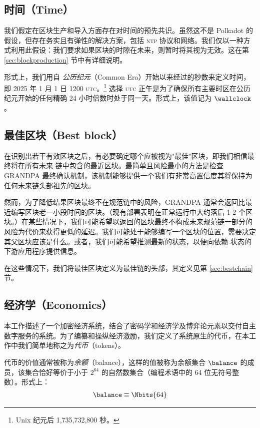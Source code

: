 \subsection{时间（Time）}\label{sec:commonera}

我们假定在区块生产和导入方面存在对时间的预先共识。虽然这不是 Polkadot 的假设，但存在务实且有弹性的解决方案，包括 \textsc{ntp} 协议和网络。我们仅以一种方式利用此假设：我们要求如果区块的时隙在未来，则暂时将其视为无效。这在第 \ref{sec:blockproduction} 节中有详细说明。

形式上，我们用自 \Jam\emph{公历纪元}（Common Era）开始以来经过的秒数来定义时间，即 2025 年 1 月 1 日 1200 \textsc{utc}。\footnote{Unix 纪元后 1,735,732,800 秒。} 选择 \textsc{utc} 正午是为了确保所有主要时区在公历纪元开始的任何精确 24 小时倍数时处于同一天。形式上，该值记为 $\wallclock$。

\subsection{最佳区块（Best block）}

在识别出若干有效区块之后，有必要确定哪个应被视为"最佳"区块，即我们相信最终将在所有未来 \Jam 链中包含的最近区块。最简单且风险最小的方法是检查 GRANDPA 最终确认机制，该机制能够提供一个我们有非常高置信度其将保持为任何未来链头部祖先的区块。

然而，为了降低结果区块最终不在规范链中的风险，GRANDPA 通常会返回比最近编写区块老一小段时间的区块。（现有部署表明在正常运行中大约落后 1-2 个区块。）在某些情况下，我们可能希望以返回的区块最终不构成未来规范链一部分的风险为代价来获得更低的延迟。\Eg 我们可能处于能够编写一个区块的位置，需要决定其父区块应该是什么。或者，我们可能希望推测最新的状态，以便向依赖 \Jam 状态的下游应用程序提供信息。

在这些情况下，我们将最佳区块定义为最佳链的头部，其定义见第 \ref{sec:bestchain} 节。

\subsection{经济学（Economics）}

本工作描述了一个加密经济系统，\ie 结合了密码学和经济学及博弈论元素以交付自主数字服务的系统。为了编纂和操纵经济激励，我们定义了系统原生的代币，在本工作中我们简单地称之为\emph{代币}（tokens）。

代币的价值通常被称为\emph{余额}（balance），这样的值被称为余额集合 $\balance$ 的成员，该集合恰好等价于小于 $2^{64}$ 的自然数集合（\ie 编程术语中的 64 位无符号整数）。形式上：
\begin{align}\label{eq:balance}
  \balance \equiv \Nbits{64}
\end{align}

